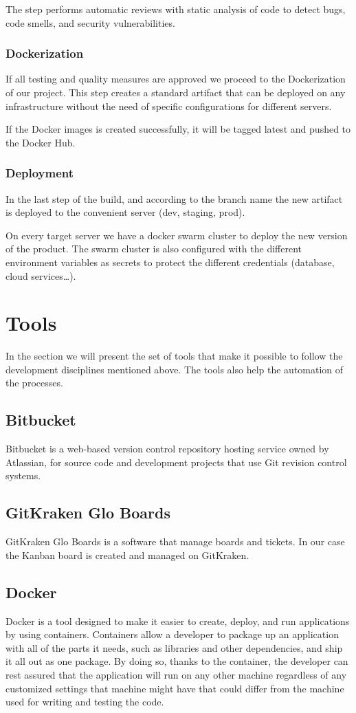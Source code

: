 \begin{spacing}{1.2}
The step performs automatic reviews with static analysis of code to detect bugs, code smells, and security vulnerabilities.
\subsubsection{Dockerization}
If all testing and quality measures are approved we proceed to the Dockerization of our project.
This step creates a standard artifact that can be deployed on any infrastructure without the need of specific configurations for different servers.

If the Docker images is created successfully, it will be tagged latest and pushed to the Docker Hub.

\subsubsection{Deployment}
In the last step of the build, and according to the branch name the new artifact is deployed to the convenient server (dev, staging, prod).

On every target server we have a docker swarm cluster to deploy the new version of the product.
The swarm cluster is also configured with the different environment variables as secrets to protect the different credentials (database, cloud services\dots).
\section{Tools}
In the section we will present the set of tools that make it possible to follow the development disciplines mentioned above. The tools also help the automation of the processes.
\subsection{Bitbucket}
Bitbucket is a web-based version control repository hosting service owned by Atlassian, for source code and development projects that use Git revision control systems.
\subsection{GitKraken Glo Boards}
GitKraken Glo Boards is a software that manage boards and tickets. In our case the Kanban board is created and managed on GitKraken.
\subsection{Docker}
Docker is a tool designed to make it easier to create, deploy, and run applications by using containers. Containers allow a developer to package up an application with all of the parts it needs, such as libraries and other dependencies, and ship it all out as one package. By doing so, thanks to the container, the developer can rest assured that the application will run on any other machine regardless of any customized settings that machine might have that could differ from the machine used for writing and testing the code.

\end{spacing}
